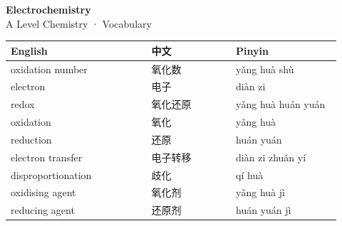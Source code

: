 \documentclass[11pt]{article}
\begin{document}
\begin{center}
  {\LARGE\bfseries Electrochemistry}\\[0.35em]
  {\large A Level Chemistry · Vocabulary}
\end{center}
\vspace{0.6em}

\begin{longtable}{@{}p{0.40\linewidth}p{0.24\linewidth}p{0.30\linewidth}@{}}
\toprule
\textbf{English} & \textbf{中文} & \textbf{Pinyin} \\
\midrule
\endhead
\bottomrule
\endlastfoot
oxidation number & 氧化数 & yǎng huà shù \\
electron & 电子 & diàn zi \\
redox & 氧化还原 & yǎng huà huán yuán \\
oxidation & 氧化 & yǎng huà \\
reduction & 还原 & huán yuán \\
electron transfer & 电子转移 & diàn zi zhuǎn yí \\
disproportionation & 歧化 & qí huà \\
oxidising agent & 氧化剂 & yǎng huà jì \\
reducing agent & 还原剂 & huán yuán jì \\
\end{longtable}
\end{document}
